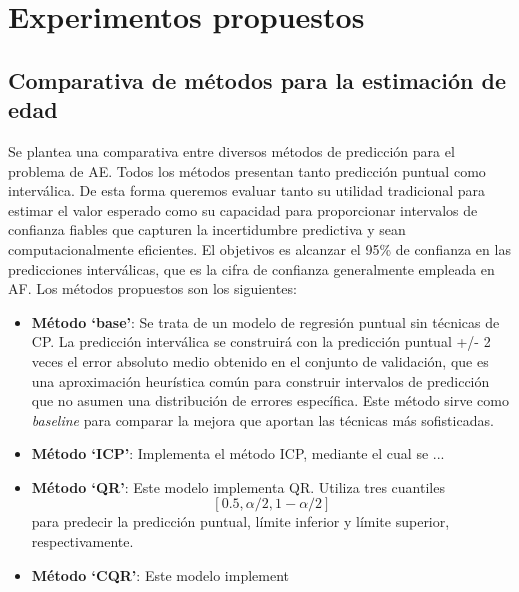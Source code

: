 
\section{Experimentos propuestos}


\subsection{Comparativa de métodos para la estimación de edad}

Se plantea una comparativa entre diversos métodos de predicción para el problema de AE. 
Todos los métodos presentan tanto predicción puntual como interválica. De esta forma queremos evaluar
tanto su utilidad tradicional para estimar el valor esperado como su capacidad para proporcionar
intervalos de confianza fiables que capturen la incertidumbre predictiva y sean computacionalmente eficientes.
El objetivos es alcanzar el 95\% de confianza en las predicciones interválicas, que es la cifra de confianza
generalmente empleada en AF. 
Los métodos propuestos son los siguientes: 

\begin{itemize}
    \item \textbf{Método `base'}: Se trata de un modelo de regresión puntual sin técnicas de CP. La predicción 
    interválica se construirá con la predicción puntual +/- 2 veces el error absoluto medio obtenido en el
    conjunto de validación, que es una aproximación heurística común para construir intervalos de predicción
    que no asumen una distribución de errores específica. 
    Este método sirve como \textit{baseline} para comparar la mejora que aportan las técnicas más 
    sofisticadas.

    \item \textbf{Método `ICP'}: Implementa el método ICP, mediante el cual se ...
    
    \item \textbf{Método `QR'}: Este modelo implementa QR. Utiliza tres cuantiles 
    $$
    [0.5, \alpha/2, 1-\alpha/2]
    $$ 
    para predecir la predicción puntual, límite inferior y límite superior, respectivamente.

    \item \textbf{Método `CQR'}: Este modelo implement

\end{itemize} 


